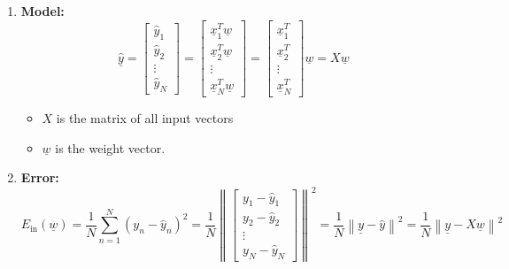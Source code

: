 \begin{definition}
\begin{enumerate}
            \item \textbf{Model:} 
            \[
            \underline{\hat{y}} = \begin{bmatrix}
            \hat{y}_1 \\
            \hat{y}_2 \\
            \vdots \\
            \hat{y}_N
            \end{bmatrix}
            = \begin{bmatrix}
            \underline{x}_1^T \underline{w} \\
            \underline{x}_2^T \underline{w} \\
            \vdots \\
            \underline{x}_N^T \underline{w}
            \end{bmatrix}
            = \begin{bmatrix}
            \underline{x}_1^T \\
            \underline{x}_2^T \\
            \vdots \\
            \underline{x}_N^T
            \end{bmatrix} \underline{w}
            = X \underline{w}
            \]
            \begin{itemize}
                \item \(X\) is the matrix of all input vectors
                \item \(\underline{w}\) is the weight vector.
            \end{itemize}

            \item \textbf{Error:} 
            \[
            E_{\text{in}}(\underline{w}) = \frac{1}{N} \sum_{n=1}^{N} (y_n - \hat{y}_n)^2 = \frac{1}{N} \left\| \begin{bmatrix}
                y_1 - \hat{y}_1 \\
                y_2 - \hat{y}_2 \\
                \vdots \\
                y_N - \hat{y}_N
                \end{bmatrix} \right\|^2 = \frac{1}{N} \left\| \underline{y} - \hat{y} \right\|^2 = \frac{1}{N} \left\| \underline{y} - X \underline{w} \right\|^2
            \]
                    
        \end{enumerate}
    \end{definition}

